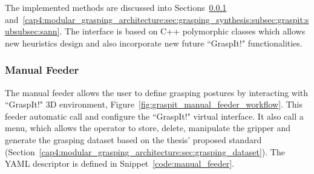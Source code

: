 \begin{figure}[h!]
\end{figure}

The implemented methods are discussed into Sections~\ref{cap4:modular_grasping_architecture:sec:grasping_synthesis:subsec:graspit:subsubsec:manual} and~\ref{cap4:modular_grasping_architecture:sec:grasping_synthesis:subsec:graspit:subsubsec:sann}. The interface is based on C++ polymorphic classes which allows new heuristics design and also incorporate new future ``GraspIt!" functionalities. 

\subsubsection{Manual Feeder}
\label{cap4:modular_grasping_architecture:sec:grasping_synthesis:subsec:graspit:subsubsec:manual}

The manual feeder allows the user to define grasping postures by interacting with ``GraspIt!" 3D environment, Figure~\ref{fig:graspit_manual_feeder_workflow}. This feeder automatic call and configure the ``GraspIt!" virtual interface. It also call a menu, which allows the operator to store, delete, manipulate the gripper and generate the grasping dataset based on the thesis' proposed standard (Section~\ref{cap4:modular_grasping_architecture:sec:grasping_dataset}). The YAML descriptor is defined in Snippet~\ref{code:manual_feeder}. %

